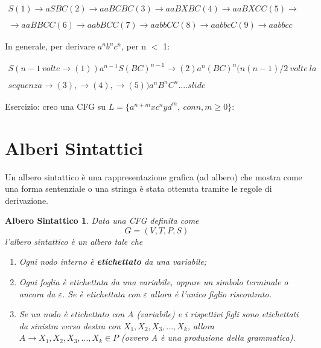 \documentclass[11pt]{article}
\newtheorem*{alberoSintattico}{Albero Sintattico}
\begin{document}
\begin{equation*}\label{stigeiz}\begin{split}
S (1)\rightarrow aSBC (2)\rightarrow aaBCBC (3)\rightarrow aaBXBC (4) \rightarrow aaBXCC (5) \rightarrow \\&\\ \rightarrow aaBBCC (6)\rightarrow aabBCC (7)\rightarrow aabbCC (8)\rightarrow aabbcC (9)\rightarrow aabbcc
\end{split}
\end{equation*}

In generale, per derivare $a^nb^nc^n$, per n $<$ 1:

\begin{equation*}
\begin{split}
S(n-1 \medspace volte \rightarrow (1)) a^{n-1}S(BC)^{n-1}\rightarrow (2) a^n(BC)^n(n(n-1)/2 \medspace volte \medspace la \\&\\ sequenza \rightarrow (3), \rightarrow (4), \rightarrow (5))a^nB^nC^n....slide
\end{split}
\end{equation*}

Esercizio: creo una CFG su $L = \{a^{n+m}xc^nyd^m, \medspace con n,m \geq 0\}$:


\section{Alberi Sintattici}
Un albero sintattico è una rappresentazione grafica (ad albero) che mostra come una forma sentenziale o una stringa è stata ottenuta tramite le regole di derivazione.

\begin{alberoSintattico}
Data una CFG definita come $$G=(V,T,P,S)$$ l'albero sintattico è un albero tale che
\begin{enumerate}
	\item Ogni nodo interno è \textbf{etichettato} da una variabile;
	\item Ogni foglia è etichettata da una variabile, oppure un simbolo terminale o ancora da $\varepsilon$. Se è etichettata con $\varepsilon$ allora è l'unico figlio riscontrato.
	\item Se un nodo è etichettato con A (variabile) e i rispettivi figli sono etichettati da sinistra verso destra con $X_1,X_2,X_3,...,X_k$, allora $A \rightarrow X_1,X_2,X_3,...,X_k \in P$ (ovvero A è una produzione della grammatica).
\end{enumerate}
\end{alberoSintattico}
\end{document}
